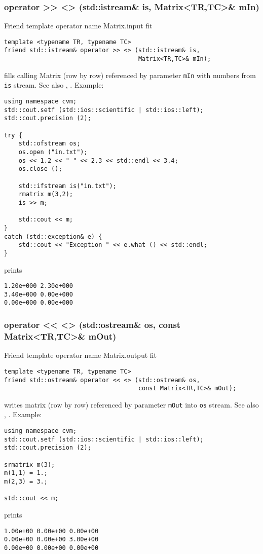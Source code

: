 \subsubsection{operator >{}> <> (std::istream\& is, Matrix<TR,TC>\& mIn)}
Friend template operator%
\pdfdest name {Matrix.input} fit
\begin{verbatim}
template <typename TR, typename TC>
friend std::istream& operator >> <> (std::istream& is,
                                     Matrix<TR,TC>& mIn);
\end{verbatim}
fills calling Matrix (row by row) referenced by parameter \verb"mIn" with numbers from
\verb"is" stream.
See also ,
.
Example:
\begin{Verbatim}
using namespace cvm;
std::cout.setf (std::ios::scientific | std::ios::left);
std::cout.precision (2);

try {
    std::ofstream os;
    os.open ("in.txt");
    os << 1.2 << " " << 2.3 << std::endl << 3.4;
    os.close ();

    std::ifstream is("in.txt");
    rmatrix m(3,2);
    is >> m;

    std::cout << m;
}
catch (std::exception& e) {
    std::cout << "Exception " << e.what () << std::endl;
}
\end{Verbatim}
prints
\begin{Verbatim}
1.20e+000 2.30e+000
3.40e+000 0.00e+000
0.00e+000 0.00e+000
\end{Verbatim}
\newpage





\subsubsection{operator <{}< <> (std::ostream\& os, const Matrix<TR,TC>\& mOut)}
Friend template operator%
\pdfdest name {Matrix.output} fit
\begin{verbatim}
template <typename TR, typename TC>
friend std::ostream& operator << <> (std::ostream& os,
                                     const Matrix<TR,TC>& mOut);
\end{verbatim}
writes matrix (row by row) referenced by parameter \verb"mOut" into
\verb"os" stream.
See also ,
.
Example:
\begin{Verbatim}
using namespace cvm;
std::cout.setf (std::ios::scientific | std::ios::left); 
std::cout.precision (2);

srmatrix m(3);
m(1,1) = 1.;
m(2,3) = 3.;

std::cout << m;
\end{Verbatim}
prints
\begin{Verbatim}
1.00e+00 0.00e+00 0.00e+00
0.00e+00 0.00e+00 3.00e+00
0.00e+00 0.00e+00 0.00e+00
\end{Verbatim}
\newpage



